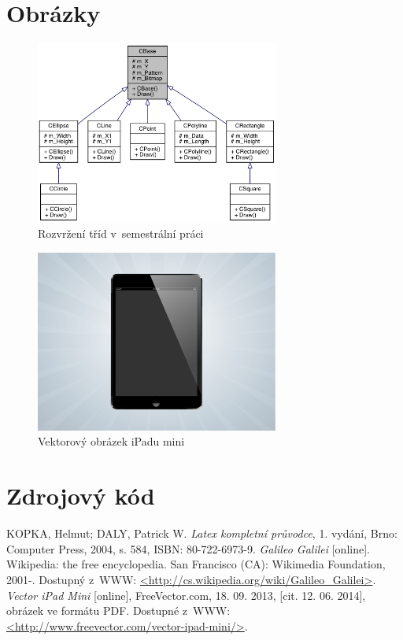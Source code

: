 \documentclass[a4paper,11pt]{article}
\begin{document}
\newpage

\section{Obrázky}

\begin{figure}[h]
	\center
	\includegraphics[width=8cm]{semestralka.png}
	\caption{Rozvržení tříd v~semestrální práci}
	\label{semestralka}
\end{figure}

\begin{figure}[h]
	\center
	\includegraphics[width=8cm]{ipad.pdf}
	\caption{Vektorový obrázek iPadu mini}
	\label{ipad}
\end{figure}

\newpage

\section{Zdrojový kód}



\newpage

\begin{thebibliography}{9}
		KOPKA, Helmut; DALY, Patrick W.
		\textit{Latex kompletní průvodce},
		1. vydání,
		Brno: Computer Press, 2004,
		s. 584,
		ISBN: 80-722-6973-9.
		\textit{Galileo Galilei} [online].
		Wikipedia: the free encyclopedia. San Francisco (CA): Wikimedia Foundation, 2001-.
		Dostupný z~WWW: \url{<http://cs.wikipedia.org/wiki/Galileo_Galilei>}.
		\textit{Vector iPad Mini} [online],
		FreeVector.com,
		18. 09. 2013,
		[cit. 12. 06. 2014],
		obrázek ve formátu PDF.
		Dostupné z~WWW: \url{<http://www.freevector.com/vector-ipad-mini/>}.
\end{thebibliography}
\end{document}
